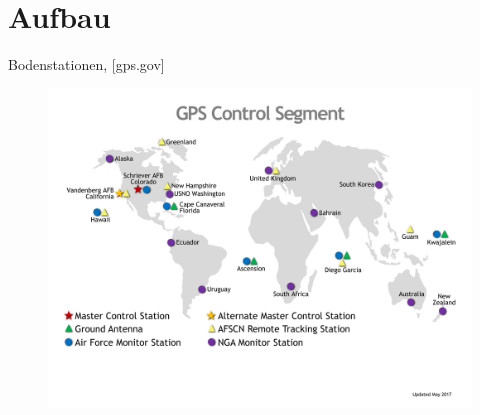 \section{Aufbau}
\begin{frame}{Bodenstationen, {\small [gps.gov]}}
    \begin{figure}
        \includegraphics[height=1.1\textheight]{images/GPS-control-segment-map.pdf}
    \end{figure}
\end{frame}

